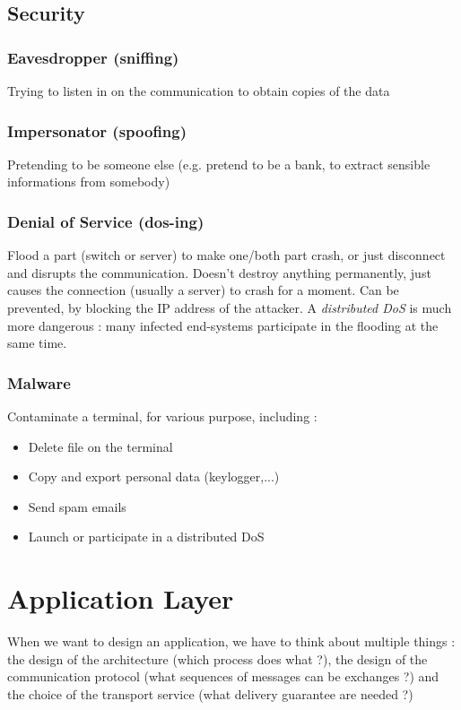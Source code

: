 \documentclass[12pt,a4paper]{article}
\begin{document}
\subsection{Security}
\subsubsection[Eavesdropper]{Eavesdropper (sniffing)}
Trying to listen in on the communication to obtain copies of the data

\subsubsection[Impersonator]{Impersonator (spoofing)}
Pretending to be someone else (e.g. pretend to be a bank, to extract sensible informations from somebody)

\subsubsection[DoS]{Denial of Service (dos-ing)}
Flood a part (switch or server) to make one/both part crash, or just disconnect and disrupts the communication. Doesn't destroy anything permanently, just causes the connection (usually a server) to crash for a moment. Can be prevented, by blocking the IP address of the attacker. A \textit{distributed DoS} is much more dangerous : many infected end-systems participate in the flooding at the same time.

\subsubsection{Malware}
Contaminate a terminal, for various purpose, including :
\begin{itemize}
	\item 	Delete file on the terminal
	\item 	Copy and export personal data (keylogger,...)
	\item 	Send spam emails
	\item 	Launch or participate in a distributed DoS
\end{itemize}

\section{Application Layer}
When we want to design an application, we have to think about multiple things : the design of the architecture (which process does what ?), the design of the communication protocol (what sequences of messages can be exchanges ?) and the choice of the transport service (what delivery guarantee are needed ?)
\end{document}
